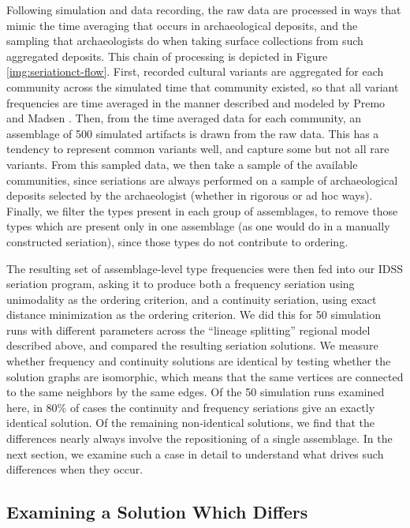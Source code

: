 \documentclass[graybox,natbib]{svmult}
\begin{document}
Following simulation and data recording, the raw data are processed in
ways that mimic the time averaging that occurs in archaeological
deposits, and the sampling that archaeologists do when taking surface
collections from such aggregated deposits. This chain of processing is
depicted in Figure \ref{img:seriationct-flow}. First, recorded cultural
variants are aggregated for each community across the simulated time
that community existed, so that all variant frequencies are time
averaged in the manner described and modeled by Premo
\citeyearpar{Premo2014} and Madsen \citeyearpar{Madsen2012}. Then, from
the time averaged data for each community, an assemblage of 500
simulated artifacts is drawn from the raw data. This has a tendency to
represent common variants well, and capture some but not all rare
variants. From this sampled data, we then take a sample of the available
communities, since seriations are always performed on a sample of
archaeological deposits selected by the archaeologist (whether in
rigorous or ad hoc ways). Finally, we filter the types present in each
group of assemblages, to remove those types which are present only in
one assemblage (as one would do in a manually constructed seriation),
since those types do not contribute to ordering.

The resulting set of assemblage-level type frequencies were then fed
into our IDSS seriation program, asking it to produce both a frequency
seriation using unimodality as the ordering criterion, and a continuity
seriation, using exact distance minimization as the ordering criterion.
We did this for 50 simulation runs with different parameters across the
``lineage splitting'' regional model described above, and compared the
resulting seriation solutions. We measure whether frequency and
continuity solutions are identical by testing whether the solution
graphs are isomorphic, which means that the same vertices are connected
to the same neighbors by the same edges. Of the 50 simulation runs
examined here, in 80\% of cases the continuity and frequency seriations
give an exactly identical solution. Of the remaining non-identical
solutions, we find that the differences nearly always involve the
repositioning of a single assemblage. In the next section, we examine
such a case in detail to understand what drives such differences when
they occur.

\subsection{Examining a Solution Which
Differs}\label{examining-a-solution-which-differs}
\end{document}
